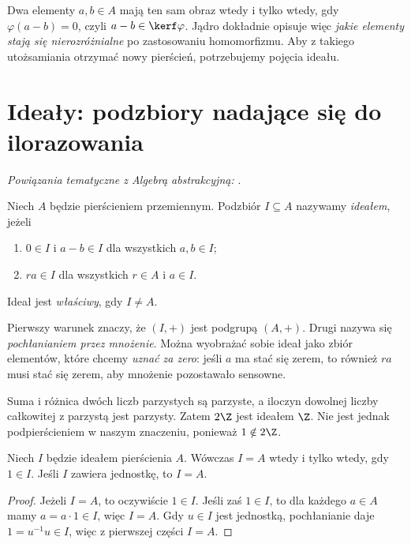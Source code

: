 \begin{uwaga}
Dwa elementy $a,b\in A$ mają ten sam obraz wtedy i tylko wtedy, gdy
$\varphi(a-b)=0$, czyli $a-b\in\kerf\varphi$.
Jądro dokładnie opisuje więc \emph{jakie elementy stają się
nierozróżnialne} po zastosowaniu homomorfizmu. Aby z takiego
utożsamiania otrzymać nowy pierścień, potrzebujemy pojęcia ideału.
\end{uwaga}

\section{Ideały: podzbiory nadające się do ilorazowania}

\noindent\emph{Powiązania tematyczne z Algebrą abstrakcyjną:} .


\begin{definicja}[Ideał]
Niech $A$ będzie pierścieniem przemiennym. Podzbiór $I\subseteq A$
nazywamy \emph{ideałem}, jeżeli
\begin{enumerate}[label=(I\arabic*)]
\item $0\in I$ i $a-b\in I$ dla wszystkich $a,b\in I$;
\item $ra\in I$ dla wszystkich $r\in A$ i $a\in I$.
\end{enumerate}
Ideał jest \emph{właściwy}, gdy $I\ne A$.
\end{definicja}

Pierwszy warunek znaczy, że $(I,+)$ jest podgrupą $(A,+)$.
Drugi nazywa się \emph{pochłanianiem przez mnożenie}.
Można wyobrażać sobie ideał jako zbiór elementów, które chcemy
\emph{uznać za zero}: jeśli $a$ ma stać się zerem, to również
$ra$ musi stać się zerem, aby mnożenie pozostawało sensowne.

\begin{przyklad}
Suma i różnica dwóch liczb parzystych są parzyste,
a iloczyn dowolnej liczby całkowitej z parzystą jest parzysty.
Zatem $2\Z$ jest ideałem $\Z$. Nie jest jednak podpierścieniem
w naszym znaczeniu, ponieważ $1\notin2\Z$.
\end{przyklad}

\begin{stwierdzenie}
Niech $I$ będzie ideałem pierścienia $A$. Wówczas
$I=A$ wtedy i tylko wtedy, gdy $1\in I$.
Jeśli $I$ zawiera jednostkę, to $I=A$.
\end{stwierdzenie}
\begin{proof}
Jeżeli $I=A$, to oczywiście $1\in I$. Jeśli zaś $1\in I$,
to dla każdego $a\in A$ mamy $a=a\cdot1\in I$, więc $I=A$.
Gdy $u\in I$ jest jednostką, pochłanianie daje
$1=u^{-1}u\in I$, więc z pierwszej części $I=A$.
\end{proof}

